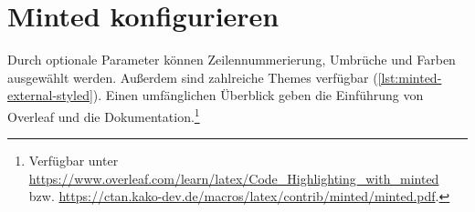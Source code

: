 
\section{Minted konfigurieren}

Durch optionale Parameter können Zeilennummerierung, Umbrüche und Farben ausgewählt werden. 
Außerdem sind zahlreiche Themes verfügbar (\cref{lst:minted-external-styled}).
Einen umfänglichen Überblick geben die Einführung von Overleaf und die Dokumentation.\footnote{Verfügbar unter \url{https://www.overleaf.com/learn/latex/Code_Highlighting_with_minted} bzw. \url{https://ctan.kako-dev.de/macros/latex/contrib/minted/minted.pdf}.}

